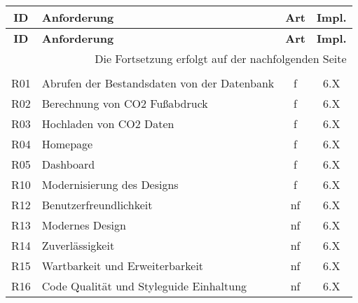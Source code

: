 \begin{longtable}{|c|l|c|c|}

    \hline
    \textbf{ID}          &
    \textbf{Anforderung} &
    \textbf{Art}         &
    \textbf{Impl.}                                                                       \\ \hline
    \endfirsthead

    \hline
    \textbf{ID}          &
    \textbf{Anforderung} &
    \textbf{Art}         &
    \textbf{Impl.}                                                                       \\ \hline
    \endhead

    \hline
    \multicolumn{4}{|r|}{{Die Fortsetzung erfolgt auf der nachfolgenden Seite}}          \\ \hline
    \endfoot

    \endlastfoot

    \multicolumn{4}{|c|}{\textbf{Muss-Anforderungen}}                                    \\ \hline

    R01                  & Abrufen der Bestandsdaten von der Datenbank        & f  & 6.X \\ \hline
    R02                  & Berechnung von CO2 Fußabdruck                      & f  & 6.X \\ \hline
    R03                  & Hochladen von CO2 Daten                            & f  & 6.X \\ \hline
    R04                  & Homepage                                           & f  & 6.X \\ \hline
    R05                  & Dashboard                                          & f  & 6.X \\ \hline
    R10                  & Modernisierung des Designs                         & f  & 6.X \\ \hline
    R12                  & Benutzerfreundlichkeit                             & nf & 6.X \\ \hline
    R13                  & Modernes Design                                    & nf & 6.X \\ \hline
    R14                  & Zuverlässigkeit                                    & nf & 6.X \\ \hline
    R15                  & Wartbarkeit und Erweiterbarkeit                    & nf & 6.X \\ \hline
    R16                  & Code Qualität und Styleguide Einhaltung            & nf & 6.X \\ \hline


\end{longtable}
